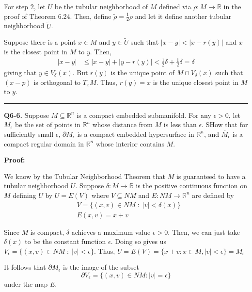 \documentclass{article}
\newcommand{\R}{\mathbb{R}}
\begin{document}
\vskip 0.5cm
For step 2, let $U$ be the tubular neighborhood of $M$ defined via $\rho : M \rightarrow \R$ in the proof of Theorem 6.24. Then, define $\tilde{\rho} = \frac{1}{2}\rho$ and let it define another tubular neighborhood $\tilde{U}$. 

\vskip 0.25cm
Suppose there is a point $x \in M$ and $y \in \tilde{U}$ such that  $|x - y| < |x - r(y)|$ and $x$ is the closest point in $M$ to $y$. Then,
\begin{align*}
  |x - y| &\leq |x - y| + |y -r(y)| < \frac{1}{2}\delta + \frac{1}{2}\delta = \delta 
\end{align*}
giving that $y \in V_{\delta}(x)$. But $r(y)$ is the unique point of $M \cap V_{\delta}(x)$ such that $(x-p)$ is orthogonal to $T_x M$. Thus, $r(y) = x$ is the unique closest point in $M$ to $y$.

\vskip 0.5cm
\hrule 
\vskip 0.5cm


\textbf{Q6-6.} Suppose $M \subseteq \R^n$ is a compact embedded submanifold. For any $\epsilon > 0$, let $M_{\epsilon}$ be the set of points in $\R^n$ whose distance from $M$ is less than $\epsilon$. SHow that for sufficiently small $\epsilon$, $\partial M_{\epsilon}$ is a compact embedded hypersurface in $\R^n$, and $\overline{M}_{\epsilon}$ is a compact regular domain in $\R^n$ whose interior contains $M$.

\vskip 0.5cm
\textbf{Proof:}

We know by the Tubular Neighborhood Theorem that $M$ is guaranteed to have a tubular neighborhood $U$. Suppose $\delta : M \rightarrow \R$ is the positive continuous function on $M$ defining $U$ by $U = E(V)$ where $V 
\subseteq NM$ and $E : NM \rightarrow \R^n$ are defined by 
\begin{align}
  &V = \{ (x,v) \in NM \; : \; |v| < \delta(x) \} \\
  &E(x, v) = x + v
\end{align}

Since $M$ is compact, $\delta$ achieves a maximum value  $\epsilon > 0$. Then, we can just take $\delta(x)$ to be the constant function $\epsilon$. Doing so gives us $V_{\epsilon} = \{ (x,v) \in NM \; : \; |v| < \epsilon \}$. Thus, $U = E(V) = \{x + v : x \in M, |v| < \epsilon\} = M_{\epsilon}$

It follows that $\partial M_{\epsilon}$ is the image of the subset 
\[\partial V_{\epsilon} = \{ (x, v) \in NM : |v| = \epsilon \}  \]
under the map $E$.
\end{document}
